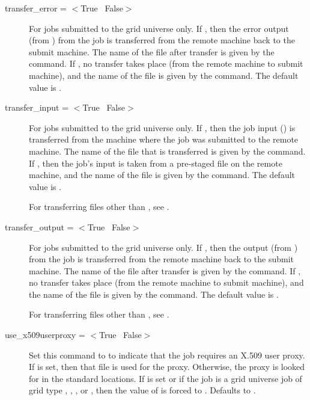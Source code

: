 \begin{description}
\label{condor-submit-transfer-error}
\item[transfer\_error = $<$True \Bar\ False$>$]
For jobs submitted to the grid universe only.
If , then the error output (from ) from the job
is transferred from the remote machine back to the submit machine.
The name of the file after transfer is given
by the  command.
If , no transfer takes place (from the remote machine
to submit machine),
and the name of the file is given
by the  command.
The default value is .

\label{condor-submit-transfer-input}
\item[transfer\_input = $<$True \Bar\ False$>$]
For jobs submitted to the grid universe only.
If , then the job input () is transferred
from the machine where the job was submitted to the remote machine.
The name of the file that is transferred is given by the
 command.
If , then the job's input is taken from a pre-staged
file on the remote machine, and
the name of the file is given by the  command.
The default value is .

For transferring files other than ,
see .

\label{condor-submit-transfer-output}
\item[transfer\_output = $<$True \Bar\ False$>$]
For jobs submitted to the grid universe only.
If , then the output (from ) from the job
is transferred from the remote machine back to the submit machine.
The name of the file after transfer is given
by the  command.
If , no transfer takes place (from the remote machine
to submit machine),
and the name of the file is given
by the  command.
The default value is .

For transferring files other than ,
see .


\label{condor-submit-use-x509userproxy}
\item[use\_x509userproxy = $<$True \Bar\ False$>$]
Set this command to  to indicate that the job requires an
X.509 user proxy.
If  is set, then that file is used for the proxy.
Otherwise, the proxy is looked for in the standard locations.
If  is set or if the job is a grid universe job
of grid type 
, , , or ,
then the value of  is forced to .
Defaults to .


\end{description}
